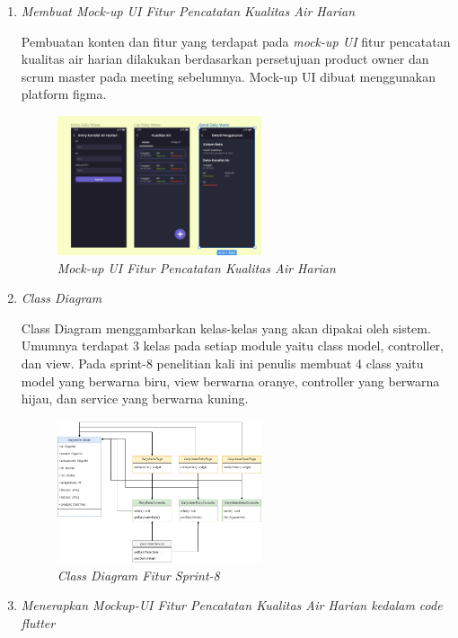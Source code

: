 \begin{enumerate}[listparindent=2em]
	
	\item{\textit{Membuat Mock-up UI Fitur Pencatatan Kualitas Air Harian}}
	
	Pembuatan konten dan fitur yang terdapat pada \textit{mock-up UI} fitur pencatatan kualitas air harian dilakukan berdasarkan persetujuan product owner dan scrum master pada meeting sebelumnya. Mock-up UI dibuat menggunakan platform figma.
	
	\begin{figure}[H]
	\centering
	\includegraphics[keepaspectratio, width=6cm]{gambar/mockupairharian}
	\caption{\textit{Mock-up UI Fitur Pencatatan Kualitas Air Harian}}
	\label{gambar:mockupairharian}
	\end{figure}

	\item{\textit{Class Diagram}}
	
	Class Diagram menggambarkan kelas-kelas yang akan dipakai oleh sistem. Umumnya terdapat 3 kelas pada setiap module yaitu class model, controller, dan view. Pada sprint-8 penelitian kali ini penulis membuat 4 class yaitu model yang berwarna biru, view berwarna oranye, controller yang berwarna hijau, dan service yang berwarna kuning.
	 
	 \begin{figure}[H]
	 \centering
	 \includegraphics[keepaspectratio, width=6cm]{gambar/dailycd}
	 \caption{\textit{Class Diagram Fitur Sprint-8}}
	 \label{gambar:dailycd}
	 \end{figure}

	\item{\textit{Menerapkan Mockup-UI Fitur Pencatatan Kualitas Air Harian kedalam code flutter}}
	

\end{enumerate}
